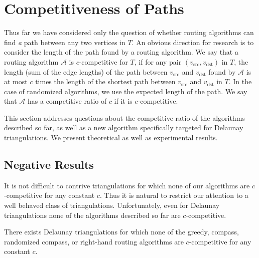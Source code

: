 \documentclass[final]{siamltex}
\newcommand{\seclabel}[1]{\label{sec:#1}}
\newcommand{\thmlabel}[1]{\label{thm:#1}}
\newcommand{\vsrc}{v_\mathrm{src}}
\newcommand{\vdest}{v_\mathrm{dst}}
\begin{document}
\section{Competitiveness of Paths}\seclabel{competitive}

Thus far we have considered only the question of whether routing
algorithms can find {\em a\/} path between any two vertices in $T$.  An
obvious direction for research is to consider the length of the path
found by a routing algorithm.  We say that a routing algorithm
$\mathcal{A}$ is $c$-competitive for $T$, if for any pair
$(\vsrc,\vdest)$ in $T$, the length (sum of the edge lengths) of the
path between $\vsrc$ and $\vdest$ found by $\mathcal{A}$ is at most
$c$ times the length of the shortest path between $\vsrc$ and $\vdest$
in $T$.  In the case of randomized algorithms, we use the expected
length of the path.  We say that $\mathcal{A}$ has a competitive ratio
of $c$ if it is $c$-competitive.

This section addresses questions about the competitive ratio of the
algorithms described so far, as well as a new algorithm specifically
targeted for Delaunay triangulations.  We present theoretical as well
as experimental results.

\subsection{Negative Results}

It is not difficult to contrive triangulations for which none of our
algorithms are $c$-competitive for any constant $c$.  Thus it is
natural to restrict our attention to a well behaved class of
triangulations.  Unfortunately, even for Delaunay triangulations none
of the algorithms described so far are $c$-competitive.

\begin{theorem}\thmlabel{no-competitive}
There exists Delaunay triangulations for which none of the greedy,
compass, randomized compass, or right-hand routing algorithms are
$c$-competitive for any constant $c$.
\end{theorem}
\end{document}
